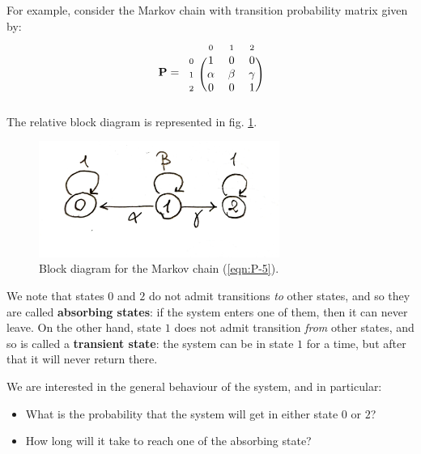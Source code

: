 \documentclass[../template.tex]{subfiles}
\begin{document}
For example, consider the Markov chain with transition probability matrix given by:
\begin{align}\label{eqn:P-5}
    \textbf{P} = \begin{blockarray}{l*{3}{c}}
        \begin{block}{l*{3}{>{\scriptstyle}c<{}}}
            & 0 & 1 & 2\\
        \end{block}
        \begin{block}{>{\scriptstyle}r<{}(*{3}{c})}
            0 & 1 & 0 & 0\\
            1 & \alpha & \beta & \gamma \\
            2 & 0 & 0 & 1\\ 
        \end{block}
    \end{blockarray}
\end{align}
The relative block diagram is represented in fig. \ref{fig:block5}.

\begin{figure}[htp]
    \centering
    \includegraphics[width=0.7\textwidth]{block5.jpeg}
    \caption{Block diagram for the Markov chain (\ref{eqn:P-5}).\label{fig:block5}} 
\end{figure}

We note that states $0$ and $2$ do not admit transitions \textit{to}  other states, and so they are called \textbf{absorbing states}: if the system enters one of them, then it can never leave. On the other hand, state $1$ does not admit transition \textit{from} other states, and so is called a \textbf{transient state}: the system can be in state $1$ for a time, but after that it will never return there. 

\medskip

We are interested in the general behaviour of the system, and in particular:
\begin{itemize}
    \item What is the probability that the system will get  in either state $0$ or $2$?
    \item How long will it take to reach one of the absorbing state?
\end{itemize}
\end{document}
